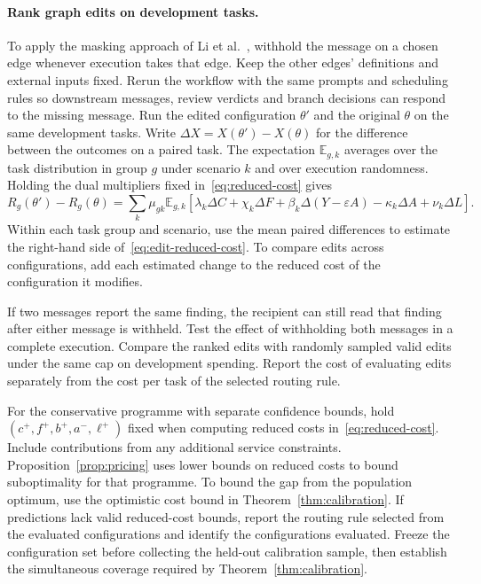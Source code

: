 \documentclass[11pt,reqno]{amsart}
\theoremstyle{definition}
\theoremstyle{remark}
\newcommand{\E}{\mathbb E}
\begin{document}
\paragraph{Rank graph edits on development tasks.}
To apply the masking approach of Li et al.~\cite{e2explainer2026}, withhold the message on a chosen edge whenever execution takes that edge.
Keep the other edges' definitions and external inputs fixed. Rerun the workflow with the same prompts and scheduling rules so downstream messages, review verdicts and branch decisions can respond to the missing message.
Run the edited configuration $\theta'$ and the original $\theta$ on the same development tasks.
Write $\Delta X=X(\theta')-X(\theta)$ for the difference between the outcomes on a paired task. The expectation $\E_{g,k}$ averages over the task distribution in group $g$ under scenario $k$ and over execution randomness.
Holding the dual multipliers fixed in~\eqref{eq:reduced-cost} gives
\begin{equation}
 R_g(\theta')-R_g(\theta)
 =\sum_k\mu_{gk}\E_{g,k}\!\left[
 \lambda_k\Delta C+\chi_k\Delta F+\beta_k\Delta(Y-\varepsilon A)
 -\kappa_k\Delta A+\nu_k\Delta L
 \right].
 \label{eq:edit-reduced-cost}
\end{equation}
Within each task group and scenario, use the mean paired differences to estimate the right-hand side of~\eqref{eq:edit-reduced-cost}. To compare edits across configurations, add each estimated change to the reduced cost of the configuration it modifies.

If two messages report the same finding, the recipient can still read that finding after either message is withheld. Test the effect of withholding both messages in a complete execution.
Compare the ranked edits with randomly sampled valid edits under the same cap on development spending. Report the cost of evaluating edits separately from the cost per task of the selected routing rule.

For the conservative programme with separate confidence bounds, hold $(c^+,f^+,b^+,a^-,\ell^+)$ fixed when computing reduced costs in~\eqref{eq:reduced-cost}. Include contributions from any additional service constraints. Proposition~\ref{prop:pricing} uses lower bounds on reduced costs to bound suboptimality for that programme. To bound the gap from the population optimum, use the optimistic cost bound in Theorem~\ref{thm:calibration}. If predictions lack valid reduced-cost bounds, report the routing rule selected from the evaluated configurations and identify the configurations evaluated.
Freeze the configuration set before collecting the held-out calibration sample, then establish the simultaneous coverage required by Theorem~\ref{thm:calibration}.
\end{document}
